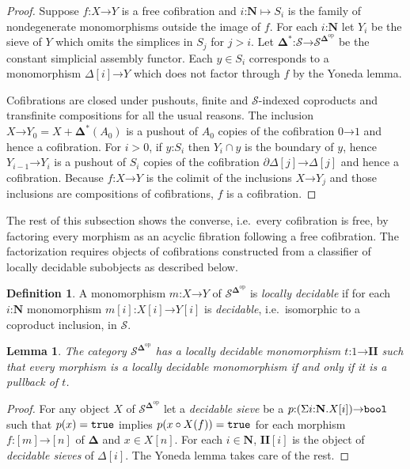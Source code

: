 \documentclass{amsart}
\theoremstyle{plain}
\newtheorem{lemma}[theorem]{Lemma}
\theoremstyle{definition}
\newtheorem{defin}[theorem]{Definition}
\newcommand\cat\mathcal
\newcommand\ri{^*}
\newcommand\nno{\mathbf N}
\newcommand\dual{^{\mathrm{op}}}
\newcommand\simCat{\mathbf\Delta}
\newcommand\s{^{\simCat\dual}}
\newcommand\of{\mathord:}
\renewcommand\to{\mathord\rightarrow}
\newcommand\simplex\Delta
\newcommand\cycle{\partial\Delta}
\begin{document}
\begin{proof} Suppose $f\of X\to Y$ is a free cofibration and $i\of\nno\mapsto S_i$ is the family of nondegenerate monomorphisms outside the image of $f$. 
For each $i\of\nno$ let $Y_i$ be the sieve of $Y$ which omits the simplices in $S_j$ for $j>i$.
Let $\simCat\ri\of \cat S\to\cat S\s$ be the constant simplicial assembly functor. 
Each $y\in S_i$ corresponds to a monomorphism $\simplex[i]\to Y$ which does not factor through $f$ by the Yoneda lemma.

Cofibrations are closed under pushouts, finite and $\cat S$-indexed coproducts and transfinite compositions for all the usual reasons.
The inclusion $X\to Y_0 = X+\simCat\ri(A_0)$ is a pushout of $A_0$ copies of the cofibration $0\to 1$ and hence a cofibration.
For $i>0$, if $y\of S_i$ then $Y_i\cap y$ is the boundary of $y$, hence $Y_{i-1}\to Y_i$ is a pushout of $S_i$ copies of the cofibration $\cycle[j]\to\simplex[j]$ and hence a cofibration. Because $f\of X\to Y$ is the colimit of the inclusions $X\to Y_j$ and those inclusions are compositions of cofibrations, $f$ is a cofibration.
\end{proof}

The rest of this subsection shows the converse, i.e.\ every cofibration is free, by factoring every morphism as an acyclic fibration following a free cofibration. The factorization requires objects of cofibrations constructed from a classifier of locally decidable subobjects as described below.

\begin{defin} A monomorphism $m\of X\to Y$ of $\cat S\s$ is \emph{locally decidable} if for each $i\of\nno$ monomorphism $m[i]\of X[i]\to Y[i]$ is \emph{decidable}, i.e.\ isomorphic to a coproduct inclusion, in $\cat S$. \end{defin}

\newcommand\LDMC{\mathbf{II}}
\begin{lemma} The category $\cat S\s$ has a locally decidable monomorphism $t\of 1\to \LDMC$ such that every morphism is a locally decidable monomorphism if and only if it is a pullback of $t$. \end{lemma}

\begin{proof} For any object $X$ of $\cat S\s$ let a \emph{decidable sieve} be a $p\of(\Sigma i\of\nno.X[i])\to\bool$ such that $p(x)=\mathtt{true}$ implies $p(x\circ X(f))=\mathtt{true}$ for each morphism $f\of [m]\to [n]$ of $\simCat$ and $x\in X[n]$. For each $i\in\nno$, $\LDMC[i]$ is the object of \emph{decidable sieves} of $\simplex[i]$. The Yoneda lemma takes care of the rest. \end{proof}
\end{document}
